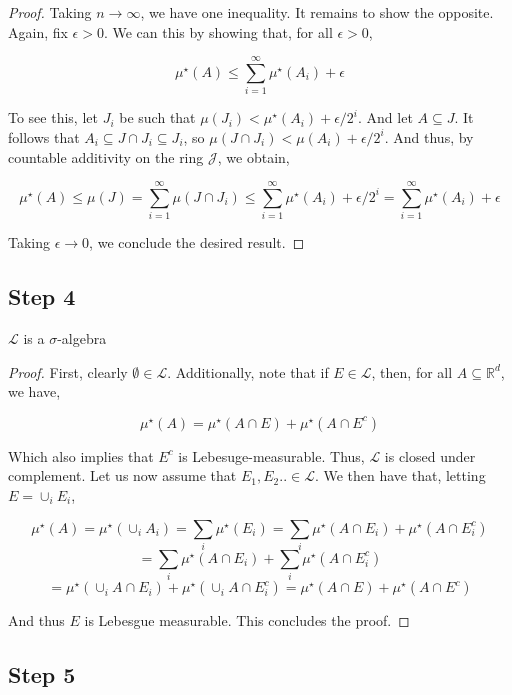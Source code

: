 \begin{proof}
   Taking $n \to \infty$, we have one inequality. It remains to show the opposite. Again, 
   fix $\epsilon > 0$. We can this by showing that, for all $\epsilon > 0$,

   \[ \mu^\star(A) \leq  \sum_{i=1}^\infty \mu^\star(A_i) + \epsilon  \]

   To see this, let $J_i$ be such that $\mu(J_i) < \mu^\star(A_i) + \epsilon/2^i$. 
   And let $A \subseteq J$. It follows that $A_i \subseteq J\cap J_i  \subseteq J_i$, so 
   $\mu(J \cap J_i) < \mu(A_i) + \epsilon/2^i$. And thus, by countable additivity on the ring 
   $\mathcal J$, we obtain,

   \[ \mu^\star(A) \leq \mu(J) = \sum_{i=1}^\infty \mu(J \cap J_i) \leq \sum_{i=1}^\infty \mu^\star(A_i) + \epsilon/2^i = \sum_{i=1}^\infty \mu^\star(A_i) + \epsilon \] 

   Taking $\epsilon \to 0$, we conclude the desired result.
\end{proof}

\subsection{Step 4}

\begin{theorem}
   $\mathcal L$ is a $\sigma$-algebra
\end{theorem}

\begin{proof}
   First, clearly $\emptyset \in \mathcal L$. Additionally, note that if 
   $E \in \mathcal L$, then, for all $A \subseteq \mathbb R^d$, we have, 

   \[ \mu^\star(A) = \mu^\star(A \cap E) + \mu^\star(A \cap E^c) \]

   Which also implies that $E^c$ is Lebesuge-measurable. Thus, $\mathcal L$ is closed 
   under complement. Let us now assume that $E_1,E_2.. \in \mathcal L$. We then have 
   that, letting $E = \cup_i E_i$,

   \[ \mu^\star(A) = \mu^\star(\cup_i A_i) = \sum_i \mu^\star(E_i) = \sum_i \mu^\star(A \cap E_i) + \mu^\star(A \cap E_i^c) \]
   \[ = \sum_i \mu^\star(A \cap E_i) + \sum_i \mu^\star(A \cap E_i^c) \]
   \[ = \mu^\star(\cup_i A \cap E_i) + \mu^\star(\cup_i A \cap E_i^c)  = \mu^\star(A \cap E) + \mu^\star(A \cap E^c) \] 
   
   And thus $E$ is Lebesgue measurable. This concludes the proof.
\end{proof}

\subsection{Step 5}

